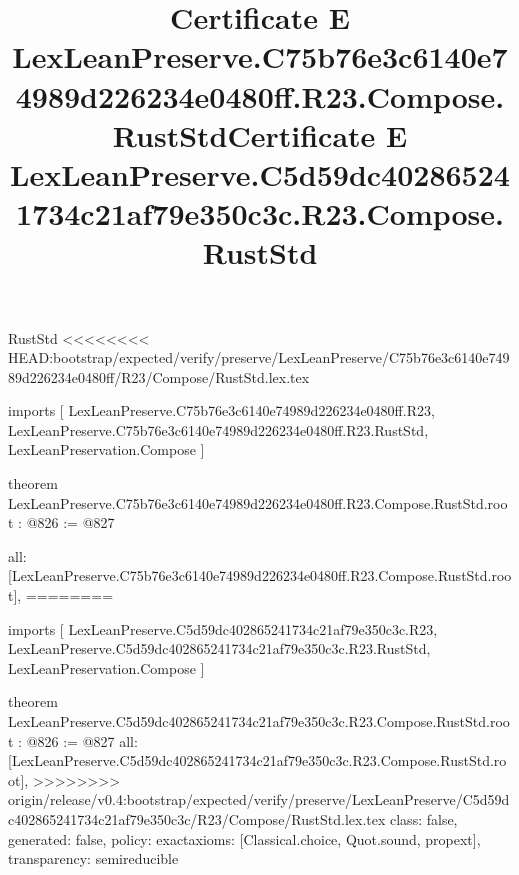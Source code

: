 \begin{lexlean}{RustStd}
<<<<<<<< HEAD:bootstrap/expected/verify/preserve/LexLeanPreserve/C75b76e3c6140e74989d226234e0480ff/R23/Compose/RustStd.lex.tex
\title{Certificate E LexLeanPreserve.C75b76e3c6140e74989d226234e0480ff.R23.Compose.RustStd}
\begin{coremodule}
imports [
  LexLeanPreserve.C75b76e3c6140e74989d226234e0480ff.R23,
  LexLeanPreserve.C75b76e3c6140e74989d226234e0480ff.R23.RustStd,
  LexLeanPreservation.Compose
]

theorem LexLeanPreserve.C75b76e3c6140e74989d226234e0480ff.R23.Compose.RustStd.root : @826 := @827 {
  all: [LexLeanPreserve.C75b76e3c6140e74989d226234e0480ff.R23.Compose.RustStd.root],
========
\title{Certificate E LexLeanPreserve.C5d59dc402865241734c21af79e350c3c.R23.Compose.RustStd}
\begin{coremodule}
imports [
  LexLeanPreserve.C5d59dc402865241734c21af79e350c3c.R23,
  LexLeanPreserve.C5d59dc402865241734c21af79e350c3c.R23.RustStd,
  LexLeanPreservation.Compose
]

theorem LexLeanPreserve.C5d59dc402865241734c21af79e350c3c.R23.Compose.RustStd.root : @826 := @827 {
  all: [LexLeanPreserve.C5d59dc402865241734c21af79e350c3c.R23.Compose.RustStd.root],
>>>>>>>> origin/release/v0.4:bootstrap/expected/verify/preserve/LexLeanPreserve/C5d59dc402865241734c21af79e350c3c/R23/Compose/RustStd.lex.tex
  class: false,
  generated: false,
  policy: exact{axioms: [Classical.choice, Quot.sound, propext]},
  transparency: semireducible
}


\end{coremodule}}
\end{coremodule}
\end{lexlean}
